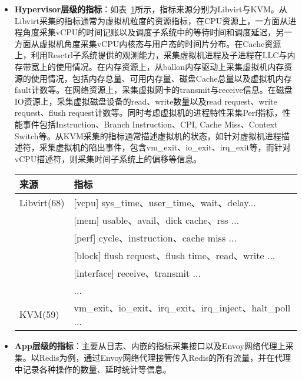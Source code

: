 \begin{itemize}
    \item \textbf{Hypervisor层级的指标}：如表~\ref{tab:hypervisor_metric}所示，指标来源分别为Libvirt与KVM。从Libvirt采集的指标通常为虚拟机粒度的资源指标，在CPU资源上，一方面从进程角度采集vCPU的时间记账以及调度子系统中的等待时间和调度延迟，另一方面从虚拟机角度采集vCPU内核态与用户态的时间片分布。在Cache资源上，利用Resctrl子系统提供的观测能力，采集虚拟机进程及子进程在LLC与内存带宽上的使用情况。在内存资源上，从ballon内存驱动上采集虚拟机内存资源的使用情况，包括内存总量、可用内存量、磁盘Cache总量以及虚拟机内存fault计数等。在网络资源上，采集虚拟网卡的transmit与receive信息。在磁盘IO资源上，采集虚拟磁盘设备的read、write数量以及read request、write request、flush request计数等。同时考虑虚拟机的进程特性采集Perf指标，性能事件包括Instruction、Branch Instruction、CPI, Cache Miss、Context Switch等。从KVM采集的指标通常描述虚拟机的状态，如针对虚拟机进程描述符，采集虚拟机的陷出事件，包含vm\_exit、io\_exit、irq\_exit等，而针对vCPU描述符，则采集时间子系统上的偏移等信息。

\begin{table}[!htbp]
    \label{tab:hypervisor_metric}
    \footnotesize%
    \setlength{\tabcolsep}{4pt}%
    \renewcommand{\arraystretch}{1.25}%
    \centering
    \begin{tabular}{ll}
        \hline
        来源 & 指标\\
        \hline
        Libvirt(68) & [vcpu] sys\_time、user\_time、wait、delay...\\
        & [mem] usable、avail、dick cache、rss ...\\
        & [perf] cycle、instruction、cache miss ...\\
        & [block] flush request、flush time、read、write ...\\
        & [interface] receive、transmit ...\\
        & ...\\
        KVM(59) & vm\_exit、io\_exit、irq\_exit、irq\_inject、halt\_poll ...\\
        \hline
    \end{tabular}
\end{table}

    \item \textbf{App层级的指标}：主要从日志、内嵌的指标采集接口以及Envoy网络代理上采集。以Redis为例，通过Envoy网络代理接管传入Redis的所有流量，并在代理中记录各种操作的数量、延时统计等信息。
    
\end{itemize}

